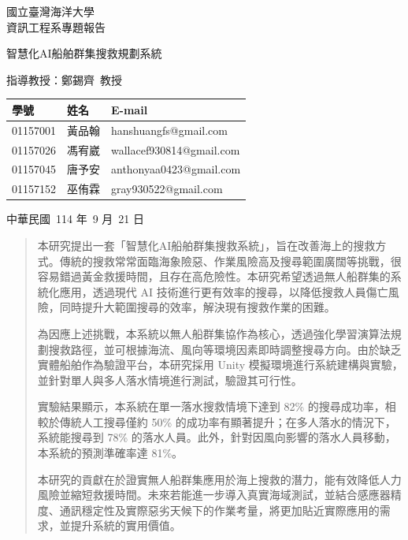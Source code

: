\documentclass[12pt,a4paper]{article}
\begin{document}
\begin{titlepage}

	\centering
	\vspace*{2cm}
	
	{\Large 國立臺灣海洋大學\\[0.5cm]資訊工程系專題報告 \par}
	
	\vspace*{1cm}
	{\Huge 智慧化AI船舶群集搜救規劃系統 \par}
	
	\vfill
	
	{\Large 指導教授：鄭錫齊\ 教授 \par}
	\vspace*{1cm}
	\begin{tabular}{lll}
	學號 & 姓名 & E-mail \\
	\hline
	01157001 & 黃品翰 & hanshuangfs@gmail.com \\
	01157026 & 馮宥崴 & wallacef930814@gmail.com \\
	01157045 & 唐予安 & anthonyaa0423@gmail.com \\
	01157152 & 巫侑霖 & gray930522@gmail.com
	\end{tabular}

	\vspace*{1cm}
	{\Large 中華民國\ 114 年\ 9 月\ 21 日 \par}

\end{titlepage}

\vspace*{0.3\textheight}
\begin{abstract}
本研究提出一套「智慧化AI船舶群集搜救系統」，旨在改善海上的搜救方式。傳統的搜救常常面臨海象險惡、作業風險高及搜尋範圍廣闊等挑戰，很容易錯過黃金救援時間，且存在高危險性。本研究希望透過無人船群集的系統化應用，透過現代 AI 技術進行更有效率的搜尋，以降低搜救人員傷亡風險，同時提升大範圍搜尋的效率，解決現有搜救作業的困難。
\par
為因應上述挑戰，本系統以無人船群集協作為核心，透過強化學習演算法規劃搜救路徑，並可根據海流、風向等環境因素即時調整搜尋方向。由於缺乏實體船舶作為驗證平台，本研究採用 Unity 模擬環境進行系統建構與實驗，並針對單人與多人落水情境進行測試，驗證其可行性。
\par
實驗結果顯示，本系統在單一落水搜救情境下達到 82\%  的搜尋成功率，相較於傳統人工搜尋僅約 50\%  的成功率有顯著提升；在多人落水的情況下，系統能搜尋到 78\%  的落水人員。此外，針對因風向影響的落水人員移動，本系統的預測準確率達 81\%。
\par
本研究的貢獻在於證實無人船群集應用於海上搜救的潛力，能有效降低人力風險並縮短救援時間。未來若能進一步導入真實海域測試，並結合感應器精度、通訊穩定性及實際惡劣天候下的作業考量，將更加貼近實際應用的需求，並提升系統的實用價值。

\end{abstract}
\end{document}
